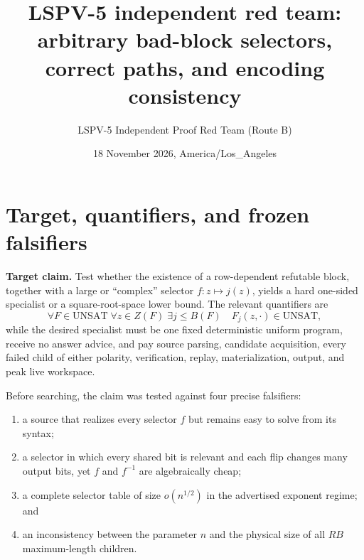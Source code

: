 \documentclass[11pt]{article}
\title{LSPV-5 independent red team: arbitrary bad-block selectors, correct paths, and encoding consistency}
\author{LSPV-5 Independent Proof Red Team (Route B)}
\date{18 November 2026, America/Los\_Angeles}
\newcommand{\UNSAT}{\mathrm{UNSAT}}
\begin{document}
\maketitle

\begin{center}
\end{center}

\section{Target, quantifiers, and frozen falsifiers}

\textbf{Target claim.}  Test whether the existence of a row-dependent refutable block, together with a large or ``complex'' selector $f:z\mapsto j(z)$, yields a hard one-sided specialist or a square-root-space lower bound.  The relevant quantifiers are
\[
 \forall F\in\UNSAT\;\forall z\in Z(F)\;\exists j\le B(F)
 \quad F_j(z,\cdot)\in\UNSAT,
\]
while the desired specialist must be one fixed deterministic uniform program, receive no answer advice, and pay source parsing, candidate acquisition, every failed child of either polarity, verification, replay, materialization, output, and peak live workspace.

Before searching, the claim was tested against four precise falsifiers:
\begin{enumerate}
  \item a source that realizes every selector $f$ but remains easy to solve from its syntax;
  \item a selector in which every shared bit is relevant and each flip changes many output bits, yet $f$ and $f^{-1}$ are algebraically cheap;
  \item a complete selector table of size $o(n^{1/2})$ in the advertised exponent regime; and
  \item an inconsistency between the parameter $n$ and the physical size of all $RB$ maximum-length children.
\end{enumerate}
\end{document}
